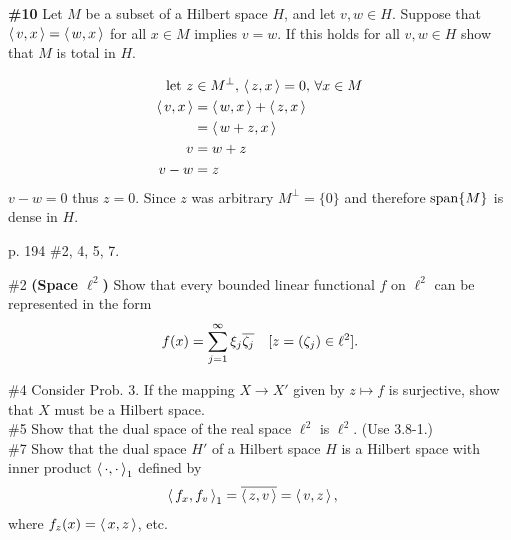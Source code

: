 \documentclass[10pt,a4paper]{report}
\begin{document}
\noindent \textbf{\#10}  Let $M$ be a subset of a Hilbert space $H$, and let $v,w \in H$.  Suppose that $\left \langle\, v,x \,\right \rangle=\left \langle\, w,x \,\right \rangle$ for all $x \in M$ implies $v=w$.  If this holds for all $v,w \in H$ show that $M$ is total in $H$.

\begin{align*}
	\text{let } z &\in M^\perp, \, \left \langle\,  z, x \,\right \rangle = 0, \,  \forall x \in M\\
	\left \langle\, v,x \,\right \rangle &= \left \langle\, w,x \,\right \rangle + \left \langle\, z,x \,\right \rangle \\
	&= \left \langle\, w+z, x \,\right \rangle\\
	v &= w+z \\
	v-w &= z
\end{align*}$v-w = 0$ thus $z=0$.  Since $z$ was arbitrary $M^\perp = \{0\}$ and therefore $\operatorname{span}\{M\}$ is dense in $H$.

\newpage
\noindent p. 194 \#2, 4, 5, 7.

\noindent \#2 \textbf{(Space $\ell^2$)} Show that every bounded linear functional $f$ on $\ell^2$ can be represented in the form
\begin{align*}
	f(x) &= \sum_{j=1}^\infty \xi_j\overline{\zeta_j} & [z=(\zeta_j)\in \ell^2].
\end{align*}

\noindent \#4 Consider Prob. 3.  If the mapping $X \to X'$ given by $z \mapsto f$ is surjective, show that $X$ must be a Hilbert space.\\

\noindent \#5 Show that the dual space of the real space $\ell^2$ is $\ell^2$. (Use 3.8-1.)\\

\noindent \#7 Show that the dual space $H'$ of a Hilbert space $H$ is a Hilbert space with inner product $\left \langle\, \cdot, \cdot \,\right \rangle_1$ defined by
\begin{align*}
	\left \langle\, f_x,f_v \,\right \rangle_1 &= \overline{\left \langle\, z,v \,\right \rangle}= \left \langle\, v,z \,\right \rangle,
\end{align*}where $f_z(x) = \left \langle\, x,z \,\right \rangle$, etc.
\end{document}
